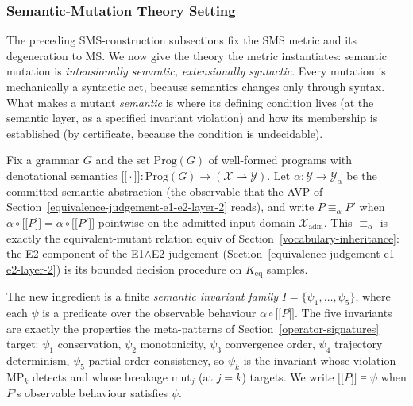 \documentclass[manuscript,screen,review]{acmart}
\begin{document}

\subsubsection{Semantic-Mutation Theory Setting}\label{theory-setting}

The preceding SMS-construction subsections fix the SMS metric and its degeneration to MS. We now
give the theory the metric instantiates: semantic mutation is
\emph{intensionally semantic, extensionally syntactic}. Every mutation
is mechanically a syntactic act, because semantics changes only through
syntax. What makes a mutant \emph{semantic} is where its defining
condition lives (at the semantic layer, as a specified invariant
violation) and how its membership is established (by certificate,
because the condition is undecidable).

Fix a grammar $G$ and the set $\mathrm{Prog}(G)$ of well-formed programs
with denotational semantics
$\mathopen{\lbrack\!\lbrack}\cdot\mathclose{\rbrack\!\rbrack} : \mathrm{Prog}(G) \to (\mathcal{X} \rightharpoonup \mathcal{Y})$.
Let $\alpha : \mathcal{Y} \to \mathcal{Y}_\alpha$ be the committed
semantic abstraction (the observable that the AVP of Section~\ref{equivalence-judgement-e1-e2-layer-2} reads), and
write $P \equiv_\alpha P'$ when
$\alpha \circ \mathopen{\lbrack\!\lbrack} P \mathclose{\rbrack\!\rbrack} = \alpha \circ \mathopen{\lbrack\!\lbrack} P' \mathclose{\rbrack\!\rbrack}$
pointwise on the admitted input domain $\mathcal{X}_{\mathrm{adm}}$.
This $\equiv_\alpha$ is exactly the equivalent-mutant relation
$\mathrm{equiv}$ of Section~\ref{vocabulary-inheritance}: the E2 component of the E1$\wedge$E2 judgement
(Section~\ref{equivalence-judgement-e1-e2-layer-2}) is its bounded decision procedure on $K_{\mathrm{eq}}$ samples.

The new ingredient is a finite \emph{semantic invariant family}
$I = \{\psi_1, \dots, \psi_5\}$, where each $\psi$ is a predicate over
the observable behaviour $\alpha \circ \mathopen{\lbrack\!\lbrack} P \mathclose{\rbrack\!\rbrack}$. The five
invariants are exactly the properties the meta-patterns of Section~\ref{operator-signatures} target:
$\psi_1$ conservation, $\psi_2$ monotonicity, $\psi_3$ convergence order,
$\psi_4$ trajectory determinism, $\psi_5$ partial-order consistency, so
$\psi_k$ is the invariant whose violation MP$_k$ detects and whose
breakage $\mathrm{mut}_j$ (at $j=k$) targets. We write
$\mathopen{\lbrack\!\lbrack} P \mathclose{\rbrack\!\rbrack} \models \psi$ when $P$'s observable behaviour
satisfies $\psi$.
\end{document}
